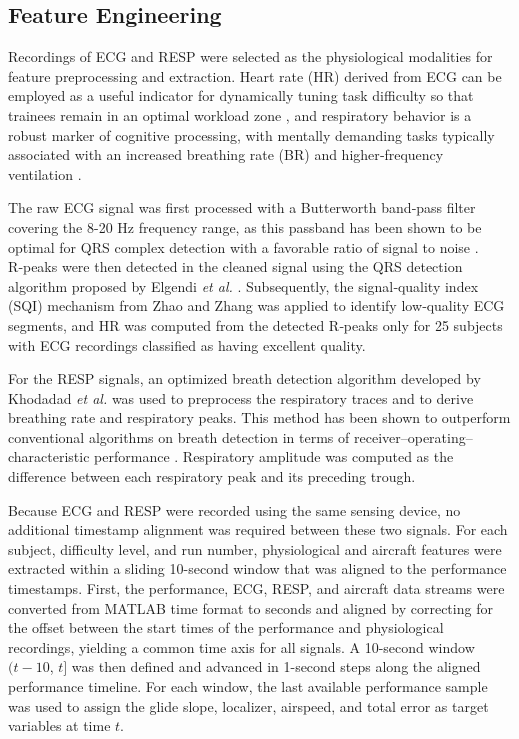 \documentclass[11pt, a4paper]{article}
\begin{document}
\subsection{Feature Engineering}
Recordings of ECG and RESP were selected as the physiological modalities for feature preprocessing and extraction. Heart rate (HR) derived from ECG can be employed as a useful indicator for dynamically tuning task difficulty so that trainees remain in an optimal workload zone \cite{koerner-2025}, and respiratory behavior is a robust marker of cognitive processing, with mentally demanding tasks typically associated with an increased breathing rate (BR) and higher‑frequency ventilation \cite{grassmann-2016}.

The raw ECG signal was first processed with a Butterworth band‑pass filter covering the 8-20 Hz frequency range, as this passband has been shown to be optimal for QRS complex detection with a favorable ratio of signal to noise \cite{elgendi-2010}. R‑peaks were then detected in the cleaned signal using the QRS detection algorithm proposed by Elgendi \emph{et al.} \cite{elgendi-2010}. Subsequently, the signal‑quality index (SQI) mechanism from Zhao and Zhang \cite{zhao-2018} was applied to identify low‑quality ECG segments, and HR was computed from the detected R‑peaks only for 25 subjects with ECG recordings classified as having excellent quality.

For the RESP signals, an optimized breath detection algorithm developed by Khodadad \emph{et al.} \cite{khodadad-2018} was used to preprocess the respiratory traces and to derive breathing rate and respiratory peaks. This method has been shown to outperform conventional algorithms on breath detection in terms of receiver–operating–characteristic performance \cite{khodadad-2018}. Respiratory amplitude was computed as the difference between each respiratory peak and its preceding trough. 

Because ECG and RESP were recorded using the same sensing device, no additional timestamp alignment was required between these two signals. For each subject, difficulty level, and run number, physiological and aircraft features were extracted within a sliding 10-second window that was aligned to the performance timestamps. First, the performance, ECG, RESP, and aircraft data streams were converted from MATLAB time format to seconds and aligned by correcting for the offset between the start times of the performance and physiological recordings, yielding a common time axis for all signals. A 10-second window $(t-10$, $t]$ was then defined and advanced in 1-second steps along the aligned performance timeline. For each window, the last available performance sample was used to assign the glide slope, localizer, airspeed, and total error as target variables at time $t$.
\end{document}
